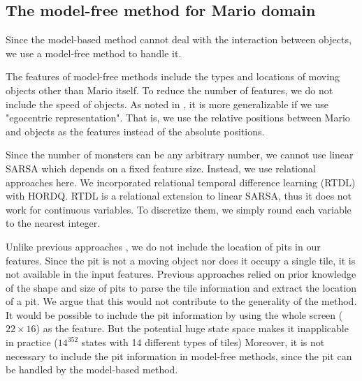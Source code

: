 



\subsection{The model-free method for Mario domain}


Since the model-based method cannot deal with the interaction between objects, we use a
model-free method to handle it.

The features of model-free methods include the types and locations of moving objects
other than Mario itself. To reduce the number of features, we do not include the speed of objects.
As noted in \cite{Gibson09}, it is more generalizable if we use "egocentric representation".
That is, we use the relative positions between Mario and objects 
as the features instead of the absolute positions.

Since the number of monsters can be any arbitrary number, 
we cannot use linear SARSA which depends on a fixed feature size.
Instead, we use relational approaches here. 
We incorporated relational temporal difference learning (RTDL) \cite{RRLTD}
with HORDQ. RTDL is a relational extension to linear SARSA, thus it does not
work for continuous variables. To discretize them, we simply
round each variable to the nearest integer. 

Unlike previous approaches \cite{Paul09, Gibson09, Mohan09, Mohan10},
we do not include the location of pits in our features.
Since the pit is not a moving object nor does it occupy a single tile,
it is not available in the input features.
Previous approaches relied on prior knowledge of the shape and size of pits to parse the tile information
and extract the location of a pit. 
We argue that this would not contribute to the generality of the method.
It would be possible to include the pit information by using the whole screen ($22 \times 16$)
as the feature. But the potential huge state space makes it inapplicable in practice ($14^{352}$ states with 14 different types of tiles)
Moreover, it is not necessary to include the pit information in model-free methods,
since the pit can be handled by the model-based method. 

